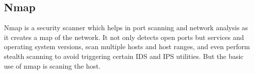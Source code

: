 \subsection{Nmap}
Nmap is a security scanner which helps in port scanning and network analysis as it creates a map of the network. It not only detects open ports but services and operating system versions, scan multiple hosts and host ranges, and even perform stealth scanning to avoid triggering certain IDS and IPS utilities. But the basic use of nmap is scaning the host.